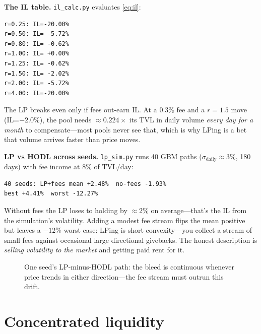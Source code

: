 \begin{example}\label{ex:il}
\textbf{The IL table.} \texttt{il\_calc.py} evaluates \eqref{eq:il}:
\begin{lstlisting}[numbers=none]
r=0.25: IL=-20.00%
r=0.50: IL= -5.72%
r=0.80: IL= -0.62%
r=1.00: IL= +0.00%
r=1.25: IL= -0.62%
r=1.50: IL= -2.02%
r=2.00: IL= -5.72%
r=4.00: IL=-20.00%
\end{lstlisting}
\begin{solution}
The LP breaks even only if fees out-earn IL. At a 0.3\% fee and a $r=1.5$ move
(IL=$-2.0\%$), the pool needs $\approx0.224\times$ its TVL in daily volume \emph{every day
for a month} to compensate---most pools never see that, which is why LPing is a bet that
volume arrives faster than price moves.
\end{solution}
\end{example}

\begin{example}\label{ex:lp}
\textbf{LP vs HODL across seeds.} \texttt{lp\_sim.py} runs 40 GBM paths
($\sigma_{\mathrm{daily}}\approx3\%$, 180 days) with fee income at 8\% of TVL/day:
\begin{lstlisting}[numbers=none]
40 seeds: LP+fees mean +2.48%  no-fees -1.93%
best +4.41%  worst -12.27%
\end{lstlisting}
\begin{solution}
Without fees the LP loses to holding by $\approx2\%$ on average---that's the IL from the
simulation's volatility. Adding a modest fee stream flips the mean positive but leaves a
$-12\%$ worst case: LPing is short convexity---you collect a stream of small fees against
occasional large directional givebacks. The honest description is \emph{selling volatility
to the market} and getting paid rent for it.
\end{solution}
\end{example}

\begin{figure}[htbp]\centering

\caption{One seed's LP-minus-HODL path: the bleed is continuous whenever price trends in
either direction---the fee stream must outrun this drift.}
\label{fig:lppath}
\end{figure}

\section{Concentrated liquidity}\label{sec:cl}

